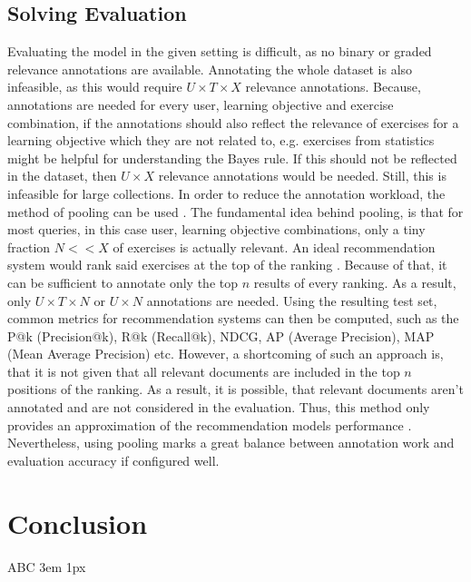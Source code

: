 \documentclass{Academic}
\begin{document}
        \FloatBarrier
        \subsection{Solving Evaluation}
        Evaluating the model in the given setting is difficult, as no binary or graded relevance annotations are available. Annotating the whole dataset is also infeasible, as this would require $U \times T \times X$ relevance annotations. Because, annotations are needed for every user, learning objective and exercise combination, if the annotations should also reflect the relevance of exercises for a learning objective which they are not related to, e.g. exercises from statistics might be helpful for understanding the Bayes rule. If this should not be reflected in the dataset, then $U \times X$ relevance annotations would be needed. Still, this is infeasible for large collections. In order to reduce the annotation workload, the method of pooling can be used \cite{suarezInformationRetrievalWeb2022}. The fundamental idea behind pooling, is that for most queries, in this case user, learning objective combinations, only a tiny fraction $N << X$ of exercises is actually relevant. An ideal recommendation system would rank said exercises at the top of the ranking \cite{suarezInformationRetrievalWeb2022}. Because of that, it can be sufficient to annotate only the top $n$ results of every ranking. As a result, only $U \times T \times N$ or $U \times N$ annotations are needed. Using the resulting test set, common metrics for recommendation systems can then be computed, such as the P@k (Precision@k), R@k (Recall@k), NDCG, AP (Average Precision), MAP (Mean Average Precision) etc. However, a shortcoming of such an approach is, that it is not given that all relevant documents are included in the top $n$ positions of the ranking. As a result, it is possible, that relevant documents aren't annotated and are not considered in the evaluation. Thus, this method only provides an approximation of the recommendation models performance \cite{suarezInformationRetrievalWeb2022}. Nevertheless, using pooling marks a great balance between annotation work and evaluation accuracy if configured well.
        
    \section{Conclusion}
    ABC
    \singlespacing
    \emergencystretch 3em
    \hfuzz 1px
    \printbibliography[heading=bibnumbered]




\end{document}
